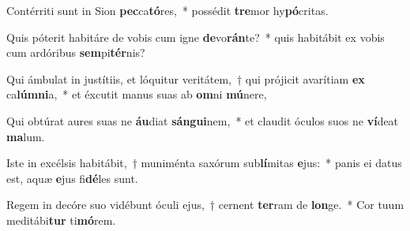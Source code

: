 \item Contérriti sunt in Sion \textbf{pec}ca\textbf{tó}res,~* possédit \textbf{tre}mor hy\textbf{pó}critas.
\item Quis póterit habitáre de vobis cum igne \textbf{de}vo\textbf{rán}te?~* quis habitábit ex vobis cum ardóribus \textbf{sem}pi\textbf{tér}nis?
\item Qui ámbulat in justítiis, et lóquitur veritátem,~† qui prójicit avarítiam \textbf{ex} ca\textbf{lúm}\textbf{ni}a,~* et éxcutit manus suas ab \textbf{om}ni \textbf{mú}nere,
\item Qui obtúrat aures suas ne \textbf{áu}diat \textbf{sán}\textbf{gui}nem,~* et claudit óculos suos ne \textbf{ví}deat \textbf{ma}lum.
\item Iste in excélsis habitábit,~† muniménta saxórum sub\textbf{lí}mitas \textbf{e}jus:~* panis ei datus est, aquæ \textbf{e}jus fi\textbf{dé}les sunt.
\item Regem in decóre suo vidébunt óculi ejus,~† cernent \textbf{ter}ram de \textbf{lon}ge.~* Cor tuum meditábi\textbf{tur} ti\textbf{mó}rem.
